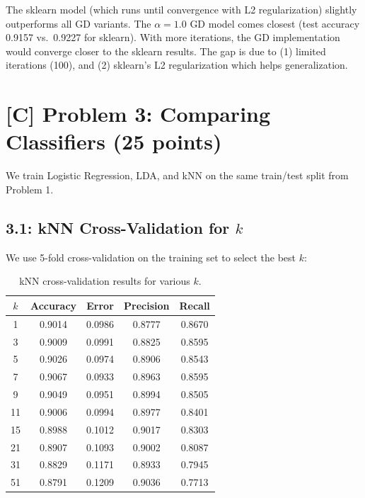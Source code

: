 \documentclass[11pt]{article}
\begin{document}
The sklearn model (which runs until convergence with L2 regularization) slightly outperforms all GD variants. The $\alpha=1.0$ GD model comes closest (test accuracy 0.9157 vs.\ 0.9227 for sklearn). With more iterations, the GD implementation would converge closer to the sklearn results. The gap is due to (1) limited iterations (100), and (2) sklearn's L2 regularization which helps generalization.

\section*{[C] Problem 3: Comparing Classifiers (25 points)}

We train Logistic Regression, LDA, and kNN on the same train/test split from Problem 1.

\subsection*{3.1: kNN Cross-Validation for $k$}

We use 5-fold cross-validation on the training set to select the best $k$:

\begin{table}[h]
\centering
\begin{tabular}{ccccc}
\toprule
$k$ & \textbf{Accuracy} & \textbf{Error} & \textbf{Precision} & \textbf{Recall} \\
\midrule
1  & 0.9014 & 0.0986 & 0.8777 & 0.8670 \\
3  & 0.9009 & 0.0991 & 0.8825 & 0.8595 \\
5  & 0.9026 & 0.0974 & 0.8906 & 0.8543 \\
7  & 0.9067 & 0.0933 & 0.8963 & 0.8595 \\
9  & 0.9049 & 0.0951 & 0.8994 & 0.8505 \\
11 & 0.9006 & 0.0994 & 0.8977 & 0.8401 \\
15 & 0.8988 & 0.1012 & 0.9017 & 0.8303 \\
21 & 0.8907 & 0.1093 & 0.9002 & 0.8087 \\
31 & 0.8829 & 0.1171 & 0.8933 & 0.7945 \\
51 & 0.8791 & 0.1209 & 0.9036 & 0.7713 \\
\bottomrule
\end{tabular}
\caption{kNN cross-validation results for various $k$.}
\end{table}
\end{document}
